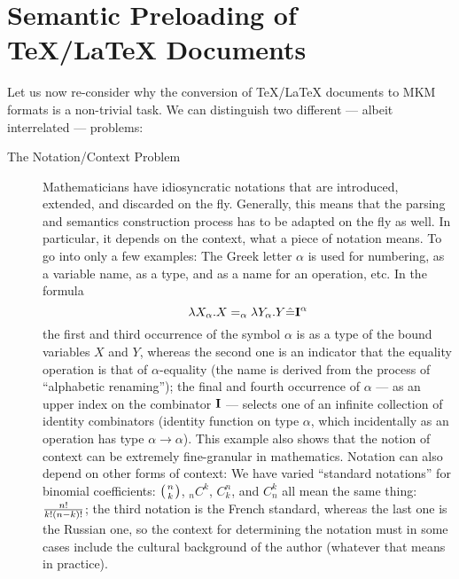 \section{Semantic Preloading of {\TeX}/{\LaTeX} Documents}\label{sec:preloading}

Let us now re-consider why the conversion of {\TeX/\LaTeX} documents to MKM formats is a
non-trivial task. We can distinguish two different --- albeit interrelated --- problems:

\begin{description}
\item[The Notation/Context Problem] Mathematicians have idiosyncratic notations
  that are introduced, extended, and discarded on the fly. Generally, this means
  that the parsing and semantics construction process has to be adapted on the fly
  as well. In particular, it depends on the context, what a piece of notation
  means. To go into only a few examples: The Greek letter $\alpha$ is used for
  numbering, as a variable name, as a type, and as a name for an operation, etc.
  In the formula
  \begin{equation}\label{alphaeq}
    \lambda{X_\alpha}.X=_\alpha\lambda{Y_\alpha}.Y\hat=\bf{I}^\alpha
  \end{equation}
  the first and third occurrence of the symbol $\alpha$ is as a type of the bound
  variables $X$ and $Y$, whereas the second one is an indicator that the equality
  operation is that of $\alpha$-equality (the name is derived from the process of
  ``alphabetic renaming''); the final and fourth occurrence of $\alpha$ --- as an
  upper index on the combinator $\bf I$ --- selects one of an infinite collection
  of identity combinators (identity function on type $\alpha$, which incidentally
  as an operation has type $\alpha\to\alpha$). This example also shows that the
  notion of context can be extremely fine-granular in mathematics. Notation can
  also depend on other forms of context: We have varied ``standard notations'' for
  binomial coefficients: $\left(n\atop k\right)$, $_nC^k$, $C^n_k$, and $C^k_n$
  all mean the same thing: $n!\over k!(n-k)!$; the third notation is the French
  standard, whereas the last one is the Russian one, so the context for
  determining the notation must in some cases include the cultural background of
  the author (whatever that means in practice).
  

\end{description}
